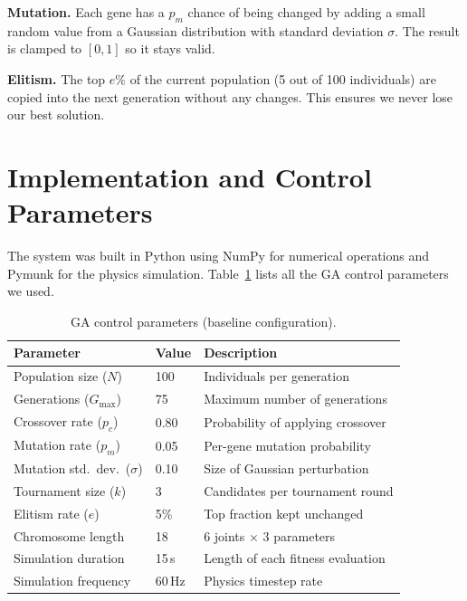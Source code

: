 \documentclass[11pt,a4paper]{article}
\begin{document}
\textbf{Mutation.} Each gene has a $p_m$ chance of being changed by adding a small random value from a Gaussian distribution with standard deviation $\sigma$. The result is clamped to $[0, 1]$ so it stays valid.

\textbf{Elitism.} The top $e\%$ of the current population (5 out of 100 individuals) are copied into the next generation without any changes. This ensures we never lose our best solution.

\section{Implementation and Control Parameters}

The system was built in Python using NumPy for numerical operations and Pymunk for the physics simulation. Table~\ref{tab:params} lists all the GA control parameters we used.

\begin{table}[H]
\centering
\caption{GA control parameters (baseline configuration).}
\label{tab:params}
\small
\begin{tabular}{@{}lll@{}}
\toprule
\textbf{Parameter} & \textbf{Value} & \textbf{Description} \\
\midrule
Population size ($N$)     & 100   & Individuals per generation \\
Generations ($G_{\max}$)  & 75    & Maximum number of generations \\
Crossover rate ($p_c$)    & 0.80  & Probability of applying crossover \\
Mutation rate ($p_m$)     & 0.05  & Per-gene mutation probability \\
Mutation std.\ dev.\ ($\sigma$)  & 0.10  & Size of Gaussian perturbation \\
Tournament size ($k$)     & 3     & Candidates per tournament round \\
Elitism rate ($e$)        & 5\%   & Top fraction kept unchanged \\
Chromosome length         & 18    & 6 joints $\times$ 3 parameters \\
Simulation duration       & 15\,s & Length of each fitness evaluation \\
Simulation frequency      & 60\,Hz & Physics timestep rate \\
\bottomrule
\end{tabular}
\end{table}
\end{document}
